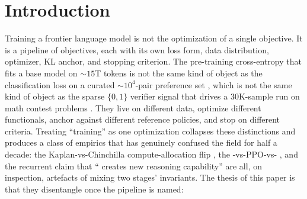 
\section{Introduction}
\label{sec:introduction}

Training a frontier language model is not the optimization of a single
objective. It is a pipeline of objectives, each with its own loss form,
data distribution, optimizer, KL anchor, and stopping criterion. The
pre-training cross-entropy that fits a base model on $\sim\!15$T tokens
\citep[\S 3.2]{deepseek-v3} is not the same kind of object as the
classification loss on a curated $\sim\!10^4$-pair preference set
\citep{rafailov2023-dpo}, which is not the same kind of object as the
sparse $\{0,1\}$ verifier signal that drives a $30$K-sample  run on
math contest problems
\citep{shao2024,deepseek-r1}. They live on different data, optimize
different functionals, anchor against different reference policies, and
stop on different criteria. Treating ``training'' as one optimization
collapses these distinctions and produces a class of empirics that has
genuinely confused the field for half a decade: the
Kaplan-vs-Chinchilla compute-allocation flip
\citep{kaplan2020,hoffmann2022-chinchilla}, the
-vs-PPO-vs- , and the recurrent claim that `` creates
new reasoning capability'' are all, on inspection, artefacts of mixing
two stages' invariants. The thesis of this paper is that they
disentangle once the pipeline is named:
